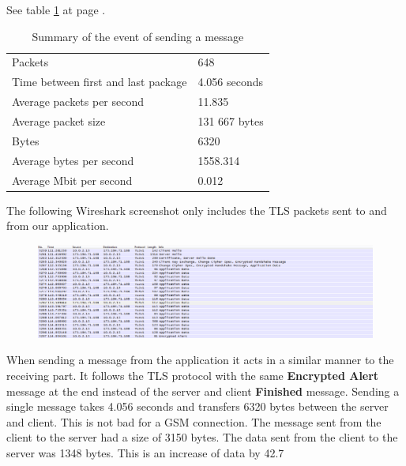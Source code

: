 See table \ref{tab:summarysenmes} at page \pageref{tab:summarysenmes}.
\begin{table}
\begin{tabular}{ll} \hline
Packets & 648 \\
Time between first and last package & 4.056 seconds \\
Average packets per second & 11.835 \\
Average packet size & 131 667 bytes \\
Bytes & 6320 \\
Average bytes per second & 1558.314 \\
Average Mbit per second & 0.012 \\ \hline
\end{tabular}
\caption{Summary of the event of sending a message} \label{tab:summarysenmes}
\end{table}

The following Wireshark screenshot only includes the TLS packets sent to and from our application.

\begin{figure}[h!]
\begin{center}
\includegraphics{ws5}
\end{center}
\end{figure}

When sending a message from the application it acts in a similar manner to the receiving part. It follows the TLS protocol with the same \textbf{Encrypted Alert} message at the end instead of the server and client \textbf{Finished} message. 
\newline
\newline
Sending a single message takes 4.056 seconds and transfers 6320 bytes between the server and client. This is not bad for a GSM connection. The message sent from the client to the server had a size of 3150 bytes. The data sent from the client to the server was 1348 bytes.
This is an increase of data by 42.7%
